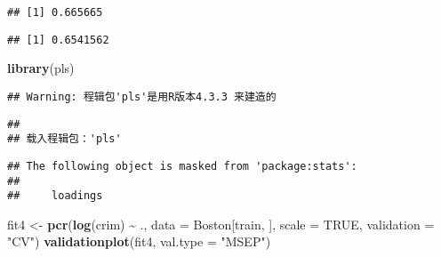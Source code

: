 \documentclass[
]{article}
\newenvironment{Shaded}{\begin{snugshade}}{\end{snugshade}}
\newcommand{\AttributeTok}[1]{\textcolor[rgb]{0.13,0.29,0.53}{#1}}
\newcommand{\ConstantTok}[1]{\textcolor[rgb]{0.56,0.35,0.01}{#1}}
\newcommand{\DecValTok}[1]{\textcolor[rgb]{0.00,0.00,0.81}{#1}}
\newcommand{\FunctionTok}[1]{\textcolor[rgb]{0.13,0.29,0.53}{\textbf{#1}}}
\newcommand{\NormalTok}[1]{#1}
\newcommand{\OtherTok}[1]{\textcolor[rgb]{0.56,0.35,0.01}{#1}}
\newcommand{\SpecialCharTok}[1]{\textcolor[rgb]{0.81,0.36,0.00}{\textbf{#1}}}
\newcommand{\StringTok}[1]{\textcolor[rgb]{0.31,0.60,0.02}{#1}}
\begin{document}
\begin{verbatim}
## [1] 0.665665
\end{verbatim}

\begin{Shaded}
\end{Shaded}

\begin{verbatim}
## [1] 0.6541562
\end{verbatim}

\begin{Shaded}
\begin{Highlighting}[]
\FunctionTok{library}\NormalTok{(pls)}
\end{Highlighting}
\end{Shaded}

\begin{verbatim}
## Warning: 程辑包'pls'是用R版本4.3.3 来建造的
\end{verbatim}

\begin{verbatim}
## 
## 载入程辑包：'pls'
\end{verbatim}

\begin{verbatim}
## The following object is masked from 'package:stats':
## 
##     loadings
\end{verbatim}

\begin{Shaded}
\begin{Highlighting}[]
\NormalTok{fit4 }\OtherTok{\textless{}{-}} \FunctionTok{pcr}\NormalTok{(}\FunctionTok{log}\NormalTok{(crim) }\SpecialCharTok{\textasciitilde{}}\NormalTok{ ., }\AttributeTok{data =}\NormalTok{ Boston[train, ], }\AttributeTok{scale =} \ConstantTok{TRUE}\NormalTok{, }\AttributeTok{validation =} \StringTok{"CV"}\NormalTok{)}
\FunctionTok{validationplot}\NormalTok{(fit4, }\AttributeTok{val.type =} \StringTok{"MSEP"}\NormalTok{)}
\end{Highlighting}
\end{Shaded}
\end{document}
